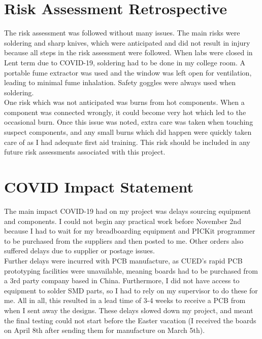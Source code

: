 \documentclass{IIBproject}
\begin{document}










\newpage




\newpage
\appendix
\appendixpage
\addappheadtotoc

\section{Risk Assessment Retrospective}
The risk assessment was followed without many issues. The main risks were soldering and sharp knives, which were anticipated and did not result in injury because all steps in the risk assessment were followed. When labs were closed in Lent term due to COVID-19, soldering had to be done in my college room. A portable fume extractor was used and the window was left open for ventilation, leading to minimal fume inhalation. Safety goggles were always used when soldering.\\

One risk which was not anticipated was burns from hot components. When a component was connected wrongly, it could become very hot which led to the occasional burn. Once this issue was noted, extra care was taken when touching suspect components, and any small burns which did happen were quickly taken care of as I had adequate first aid training. This risk should be included in any future risk assessments associated with this project.\\


\newpage
\section{COVID Impact Statement}
The main impact COVID-19 had on my project was delays sourcing equipment and components. I could not begin any practical work before November 2nd because I had to wait for my breadboarding equipment and PICKit programmer to be purchased from the suppliers and then posted to me. Other orders also suffered delays due to supplier or postage issues.\\

Further delays were incurred with PCB manufacture, as CUED's rapid PCB prototyping facilities were unavailable, meaning boards had to be purchased from a 3rd party company based in China. Furthermore, I did not have access to equipment to solder SMD parts, so I had to rely on my supervisor to do these for me. All in all, this resulted in a lead time of 3-4 weeks to receive a PCB from when I sent away the designs. These delays slowed down my project, and meant the final testing could not start before the Easter vacation (I received the boards on April 8th after sending them for manufacture on March 5th).\\
\end{document}
